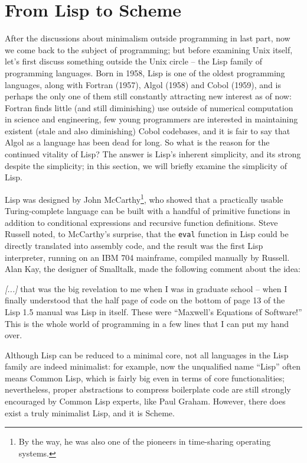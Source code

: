 \newpart
\section{From Lisp to Scheme}\label{sec:lisp}

After the discussions about minimalism outside programming in last part, now
we come back to the subject of programming; but before examining Unix itself,
let's first discuss something outside the Unix circle -- the Lisp family of
programming languages.  Born in 1958, Lisp is one of the
oldest programming languages, along with Fortran (1957), Algol (1958) and Cobol
(1959), and is perhaps the only one of them still constantly attracting new
interest as of now: Fortran finds little (and still diminishing) use outside
of numerical computation in science and engineering, few young programmers are
interested in maintaining existent (stale and also diminishing) Cobol codebases,
and it is fair to say that Algol as a language has been dead for long.  So what
is the reason for the continued vitality of Lisp?  The answer is Lisp's inherent
simplicity, and its strong  despite the simplicity;
in this section, we will briefly examine the simplicity of Lisp.

Lisp was designed by John McCarthy\footnote{By the way, he was also one of the
pioneers in time-sharing operating systems.}, who showed that a practically
usable Turing-complete language can be built with a handful of primitive
functions in addition to conditional expressions and recursive function
definitions.  Steve Russell noted, to McCarthy's
surprise, that the \verb|eval| function in Lisp could be directly translated
into assembly code, and the result was the first Lisp interpreter, running on
an IBM 704 mainframe, compiled manually by Russell.  Alan Kay, the designer of
Smalltalk, made the following comment about the idea:
\begin{quoting}
	\emph{[...]} that was the big revelation to me when I was in graduate
	school -- when I finally understood that the half page of code on the
	bottom of page 13 of the Lisp 1.5 manual was Lisp
	in itself.  These were ``Maxwell's Equations of Software!''  This is the
	whole world of programming in a few lines that I can put my hand over.
\end{quoting}
Although Lisp can be reduced to a minimal core, not all languages in
the Lisp family are indeed minimalist: for example, now the unqualified
name ``Lisp'' often means Common Lisp, which is fairly big even in terms
of core functionalities; nevertheless, proper abstractions to compress
boilerplate code are still strongly encouraged by Common Lisp experts,
like Paul Graham.  However, there does exist
a truly minimalist Lisp, and it is Scheme.

